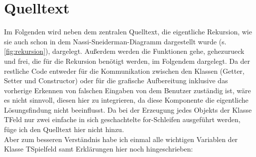 \documentclass[11pt,a4paper,twocolumn,ngerman]{scrartcl}
\begin{document}
\section{Quelltext}
Im Folgenden wird neben dem zentralen Quelltext, die eigentliche Rekursion, wie sie auch schon in dem Nassi-Sneiderman-Diagramm dargestellt wurde (s. \autoref{fig:rekursion}), dargelegt. Außerdem werden die Funktionen \glqq{}gehe\grqq{}, \glqq{}gehezurueck\grqq{} und \glqq{}frei\grqq{}, die für die Rekursion benötigt werden, im Folgendem dargelegt. Da der restliche Code entweder für die Kommunikation zwischen den Klassen (Getter, Setter und Constructor) oder für die grafische Aufbereitung inklusive das vorherige Erkennen von falschen Eingaben von dem Benutzer zuständig ist, wäre es nicht sinnvoll, diesen hier zu integrieren, da diese Komponente die eigentliche Lösungsfindung nicht beeinflusst. Da bei der Erzeugung jedes Objekts der Klasse TFeld \glqq{}nur\grqq{} zwei einfache in sich geschachtelte for-Schleifen ausgeführt werden, füge ich den Quelltext hier nicht hinzu.\\
Aber zum besseren Verständnis habe ich einmal alle wichtigen Variablen der Klasse TSpielfeld samt Erklärungen hier noch hingeschrieben: \\ \\ \\ \\ \\ \\ \\ \\ \\ \\ \\ \\ \\ \\ \\ \\ \\ \\ \\ \\ \\ \\ \\ \\ \\ \\ \\ \\ \\ \\
\end{document}
